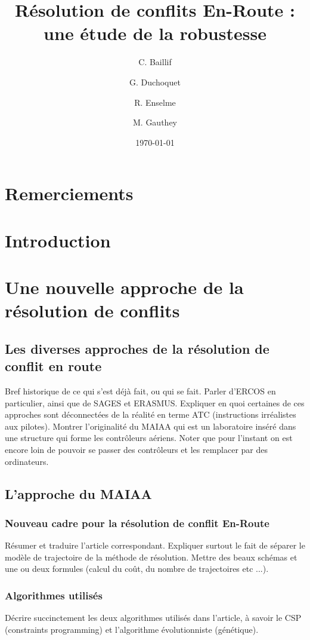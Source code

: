 \documentclass[11pt]{report}
\begin{document}
\title{Résolution de conflits En-Route : une étude de la robustesse}
\author{C. Baillif \and G. Duchoquet \and R. Enselme \and M. Gauthey}
\date{\today}
\maketitle

\chapter*{Remerciements}


\tableofcontents

\chapter*{Introduction}
 

\chapter{Une nouvelle approche de la résolution de conflits}
\section{Les diverses approches de la résolution de conflit en route}
Bref historique de ce qui s'est déjà fait, ou qui se fait. Parler d'ERCOS en particulier, ainsi que de SAGES et ERASMUS. Expliquer en quoi certaines de ces approches sont déconnectées de la réalité en terme ATC (instructions irréalistes aux pilotes). Montrer l'originalité du MAIAA qui est un laboratoire inséré dans une structure qui forme les contrôleurs aériens. Noter que pour l'instant on est encore loin de pouvoir se passer des contrôleurs et les remplacer par des ordinateurs.
\section{L'approche du MAIAA}
\subsection{Nouveau cadre pour la résolution de conflit En-Route}
Résumer et traduire l'article correspondant. Expliquer surtout le fait de séparer le modèle de trajectoire de la méthode de résolution. Mettre des beaux schémas et une ou deux formules (calcul du coût, du nombre de trajectoires etc ...).
\subsection{Algorithmes utilisés}
Décrire succinctement les deux algorithmes utilisés dans l'article, à savoir le CSP (constraints programming) et l'algorithme évolutionniste (génétique).
\end{document}
